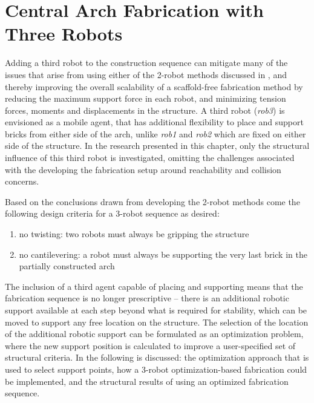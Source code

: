 \section{Central Arch Fabrication with Three Robots}\label{sec: fab_strategies_3rob}
Adding a third robot to the construction sequence can mitigate many of the issues that arise from using either of the 2-robot methods discussed in , and thereby improving the overall scalability of a scaffold-free fabrication method by reducing the maximum support force in each robot, and minimizing tension forces, moments and displacements in the structure. A third robot (\textit{rob3}) is envisioned as a mobile agent, that has additional flexibility to place and support bricks from either side of the arch, unlike \textit{rob1} and \textit{rob2} which are fixed on either side of the structure. In the research presented in this chapter, only the structural influence of this third robot is investigated, omitting the challenges associated with the developing the fabrication setup around reachability and collision concerns.

Based on the conclusions drawn from developing the 2-robot methods come the following design criteria for a 3-robot sequence as desired:

\begin{enumerate}
	\item no twisting: two robots must always be gripping the structure 
	\item no cantilevering: a robot must always be supporting the very last brick in the partially constructed arch
\end{enumerate}

The inclusion of a third agent capable of placing and supporting means that the fabrication sequence is no longer prescriptive -- there is an additional robotic support available at each step beyond what is required for stability, which can be moved to support any free location on the structure. The selection of the location of the additional robotic support can be formulated as an optimization problem, where the new support position is calculated to improve a user-specified set of structural criteria. In  the following is discussed: the optimization approach that is used to select support points, how a 3-robot optimization-based fabrication could be implemented, and the structural results of using an optimized fabrication sequence.

